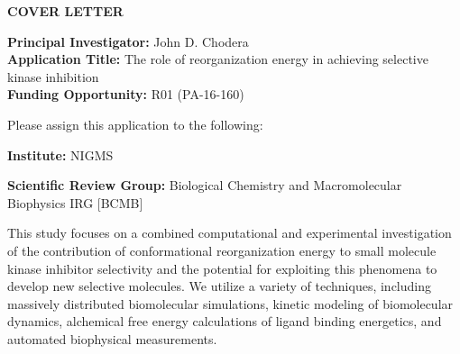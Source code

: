 \documentclass[11pt]{article}
\begin{document}
%

\begin{center}
{\bf COVER LETTER}

\end{center}

\vspace{0.2in}

{\bf Principal Investigator:} John D. Chodera \\
{\bf Application Title:} The role of reorganization energy in achieving selective kinase inhibition \\
{\bf Funding Opportunity:} R01 (PA-16-160)

\vspace{0.2in}

Please assign this application to the following:

{\bf Institute:} NIGMS

{\bf Scientific Review Group:} Biological Chemistry and Macromolecular Biophysics IRG [BCMB]

\vspace{0.2in}

This study focuses on a combined computational and experimental investigation of the contribution of conformational reorganization energy to small molecule kinase inhibitor selectivity and the potential for exploiting this phenomena to develop new selective molecules.
We utilize a variety of techniques, including massively distributed biomolecular simulations, kinetic modeling of biomolecular dynamics, alchemical free energy calculations of ligand binding energetics, and automated biophysical measurements.
\end{document}
